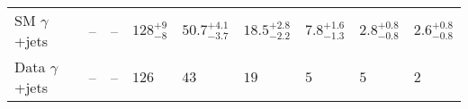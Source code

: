 \begin{table}[ht!]
\begin{tabular}{ lllllllll }
\hline
SM $\gamma$+jets\T      & --                             & --                             & $128^{+9}_{-8}$                & $50.7^{+4.1}_{-3.7}$           & $18.5^{+2.8}_{-2.2}$           & $7.8^{+1.6}_{-1.3}$            & $2.8^{+0.8}_{-0.8}$            & $2.6^{+0.8}_{-0.8}$            \\ 
Data $\gamma$+jets\B    & --                             & --                             & $126$                          & $43$                           & $19$                           & $5$                            & $5$                            & $2$                            \\ 
\hline
\end{tabular}
\end{table}



